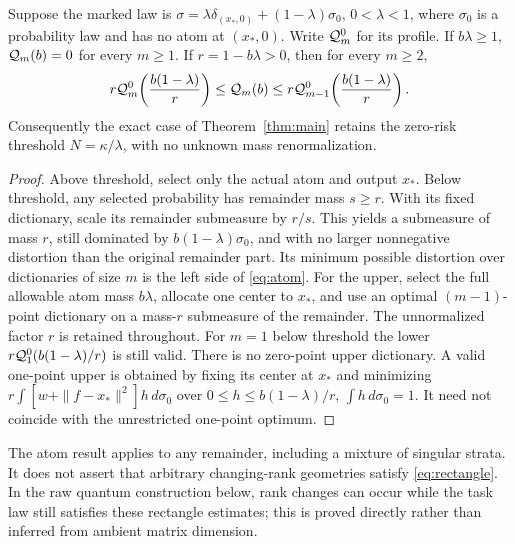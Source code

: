 \begin{proposition}\label{prop:atom}
Suppose the marked law is
$\sigma=\lambda\delta_{(x_*,0)}+(1-\lambda)\sigma_0$, $0<\lambda<1$, where $\sigma_0$ is a probability law and has no atom at $(x_*,0)$. Write $\mathcal Q_m^0$ for its profile. If $b\lambda\ge1$, $\mathcal Q_m(b)=0$ for every $m\ge1$. If $r=1-b\lambda>0$, then for every $m\ge2$,
\begin{equation}\label{eq:atom}
 r\mathcal Q_m^0\!\left(\frac{b(1-\lambda)}r\right)
 \le\mathcal Q_m(b)\le
 r\mathcal Q_{m-1}^0\!\left(\frac{b(1-\lambda)}r\right).
\end{equation}
Consequently the exact case of Theorem~\ref{thm:main} retains the zero-risk threshold $N=\kappa/\lambda$, with no unknown mass renormalization.
\end{proposition}
\begin{proof}
Above threshold, select only the actual atom and output $x_*$. Below threshold, any selected probability has remainder mass $s\ge r$. With its fixed dictionary, scale its remainder submeasure by $r/s$. This yields a submeasure of mass $r$, still dominated by $b(1-\lambda)\sigma_0$, and with no larger nonnegative distortion than the original remainder part. Its minimum possible distortion over dictionaries of size $m$ is the left side of \eqref{eq:atom}. For the upper, select the full allowable atom mass $b\lambda$, allocate one center to $x_*$, and use an optimal $(m-1)$-point dictionary on a mass-$r$ submeasure of the remainder. The unnormalized factor $r$ is retained throughout. For $m=1$ below threshold the lower $r\mathcal Q_1^0(b(1-\lambda)/r)$ is still valid. There is no zero-point upper dictionary. A valid one-point upper is obtained by fixing its center at $x_*$ and minimizing $r\int[w+\|f-x_*\|^2]h\,d\sigma_0$ over $0\le h\le b(1-\lambda)/r$, $\int h\,d\sigma_0=1$. It need not coincide with the unrestricted one-point optimum.
\end{proof}

The atom result applies to any remainder, including a mixture of singular strata. It does not assert that arbitrary changing-rank geometries satisfy \eqref{eq:rectangle}. In the raw quantum construction below, rank changes can occur while the task law still satisfies these rectangle estimates; this is proved directly rather than inferred from ambient matrix dimension.
